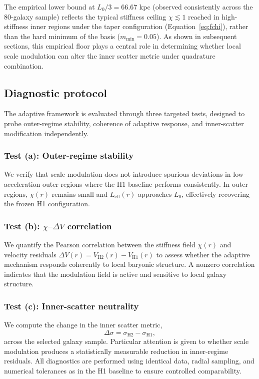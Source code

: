 \documentclass[twocolumn,linenumbers]{aastex701}
\begin{document}
The empirical lower bound at $L_0/3 = 66.67$ kpc (observed consistently across
the 80-galaxy sample) reflects the typical stiffness ceiling $\chi \lesssim 1$
reached in high-stiffness inner regions under the taper configuration
(Equation~\ref{eq:fchi}), rather than the hard minimum of the basis
($m_{\min} = 0.05$). As shown in subsequent sections, this empirical floor
plays a central role in determining whether local scale modulation can alter
the inner scatter metric under quadrature combination.

\subsection{Diagnostic protocol}
\label{subsec:protocol}

The adaptive framework is evaluated through three targeted tests, designed
to probe outer-regime stability, coherence of adaptive response, and
inner-scatter modification independently.

\subsubsection{Test (a): Outer-regime stability}

We verify that scale modulation does not introduce spurious deviations in
low-acceleration outer regions where the H1 baseline performs consistently.
In outer regions, $\chi(r)$ remains small and $L_{\mathrm{eff}}(r)$
approaches $L_0$, effectively recovering the frozen H1 configuration.

\subsubsection{Test (b): $\chi$--$\Delta V$ correlation}

We quantify the Pearson correlation between the stiffness field $\chi(r)$
and velocity residuals $\Delta V(r) = V_{\mathrm{H2}}(r) - V_{\mathrm{H1}}(r)$
to assess whether the adaptive mechanism responds coherently to local
baryonic structure. A nonzero correlation indicates that the modulation field
is active and sensitive to local galaxy structure.

\subsubsection{Test (c): Inner-scatter neutrality}

We compute the change in the inner scatter metric,
\begin{equation}
	\Delta \sigma = \sigma_{\mathrm{H2}} - \sigma_{\mathrm{H1}},
	\label{eq:scatter}
\end{equation}
across the selected galaxy sample. Particular attention is given to whether
scale modulation produces a statistically measurable reduction in inner-regime
residuals. All diagnostics are performed using identical data, radial sampling,
and numerical tolerances as in the H1 baseline to ensure controlled
comparability.
\end{document}

